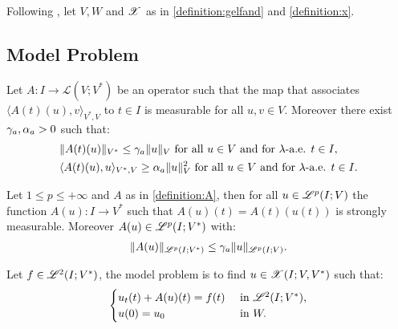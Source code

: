 Following \cite[p. 124]{Ern2021}, let $V, W$ and $\mathscr{X}$ as in \ref{definition:gelfand} and \ref{definition:x}.

\subsection{Model Problem}

\begin{definition}[A] \label{definition:A} %
    Let $A \colon I \rightarrow \mathcal{L}(V;V^*)$ be an operator such that the map that associates $\langle A(t)(u), v \rangle_{V^*, V}$ to $t \in I$ is measurable for all $u, v \in V$. Moreover there exist $\gamma_{a}, \alpha_{a} > 0$ such that:
    \begin{align} \label{equation:a}
        & \lVert A(t)(u) \rVert_{V^*} \leq \gamma_{a} \lVert u \rVert_V \text{ for all } u \in V \text{ and for } \lambda \text{-a.e. } t \in I, \\
        & \langle A(t)(u), u \rangle_{V^*, V} \geq \alpha_{a} \lVert u \rVert_V^2 \text{ for all } u \in V \text{ and for } \lambda \text{-a.e. } t \in I.
    \end{align}
\end{definition}

\begin{lemma}
    Let $1 \leq p \leq +\infty$ and  $A$ as in \ref{definition:A}, then for all $u \in \mathscr{L}^{p}(I; V)$ the function $A(u) \colon I \rightarrow V^*$ such that $A(u)(t) = A(t)(u(t))$ is strongly measurable. Moreover $A(u) \in \mathscr{L}^{p}(I; V^*)$ with:
    \begin{gather}
        \lVert A(u) \rVert_{\mathscr{L}^{p}(I; V^*)} \leq \gamma_{a} \lVert u \rVert_{\mathscr{L}^{p}(I; V)}.
    \end{gather}
\end{lemma}

\begin{definition}
    Let $f \in \mathscr{L}^{2}(I; V^*)$, the model problem is to find $u \in \mathscr{X}(I; V, V^*)$ such that:
    \begin{gather}
        \begin{cases} \label{equation:model}
            u_t(t) + A(u)(t) = f(t) & \text{ in } \mathscr{L}^{2}(I; V^*), \\
            u(0) = u_0 & \text{ in } W.
        \end{cases}
    \end{gather}
\end{definition}

